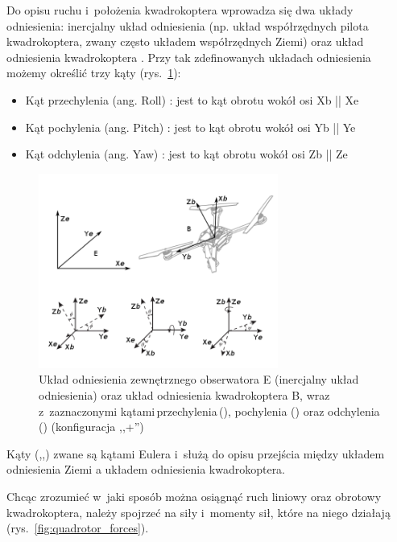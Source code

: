 Do opisu ruchu i~położenia kwadrokoptera wprowadza się dwa układy odniesienia: inercjalny układ odniesienia (np. układ współrzędnych pilota kwadrokoptera, zwany często układem współrzędnych Ziemi) oraz układ odniesienia kwadrokoptera \cite{quadro4, quadro5}. Przy tak zdefinowanych układach odniesienia możemy określić trzy kąty (rys.~\ref{fig:quadrotor_frames.png}):

\begin{itemize}
	\item Kąt przechylenia (ang. Roll) \straightphi: jest to kąt obrotu wokół osi Xb || Xe
	\item Kąt pochylenia (ang. Pitch) \straighttheta: jest to kąt obrotu wokół osi Yb || Ye 
	\item Kąt odchylenia (ang. Yaw) \textpsi: jest to kąt obrotu wokół osi Zb || Ze
\end{itemize}

\begin{figure}[!htb]
	\centering
		\includegraphics[width=0.7\textwidth]{Pictures/quadrotor_frames.png}
		\caption[Układy odniesienia]{Układ odniesienia zewnętrznego obserwatora E (inercjalny układ odniesienia) oraz układ odniesienia kwadrokoptera B, wraz z~zaznaczonymi kątami\,przechylenia\,(\straightphi), pochylenia (\straighttheta) oraz odchylenia (\textpsi) (konfiguracja ,,+'')~\cite{quadro6}}
	\label{fig:quadrotor_frames.png}
\end{figure}

Kąty (\straightphi,\straighttheta,\textpsi) zwane są kątami Eulera i~służą do opisu przejścia między układem odniesienia Ziemi a układem odniesienia kwadrokoptera.

Chcąc zrozumieć w~jaki sposób można osiągnąć ruch liniowy oraz obrotowy kwadrokoptera, należy spojrzeć na siły i~momenty sił, które na niego działają (rys.~\ref{fig:quadrotor_forces}). 

